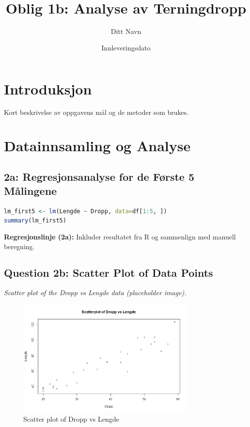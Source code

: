 \documentclass{article}
\title{Oblig 1b: Analyse av Terningdropp}
\author{Ditt Navn}
\date{Innleveringsdato}
\begin{document}
\maketitle

\section{Introduksjon}
Kort beskrivelse av oppgavens mål og de metoder som brukes.

\section{Datainnsamling og Analyse}

\subsection{2a: Regresjonsanalyse for de Første 5 Målingene}
\begin{lstlisting}[language=R]
lm_first5 <- lm(Lengde ~ Dropp, data=df[1:5, ])
summary(lm_first5)
\end{lstlisting}
\textbf{Regresjonslinje (2a):} Inkluder resultatet fra R og sammenlign med manuell beregning.

\subsection{Question 2b: Scatter Plot of Data Points}
\textit{Scatter plot of the Dropp vs Lengde data (placeholder image).}
\begin{figure}[h]
    \centering
    \includegraphics[width=0.8\textwidth]{Rplot03.png}
    \caption{Scatter plot of Dropp vs Lengde}
\end{figure}
\end{document}
